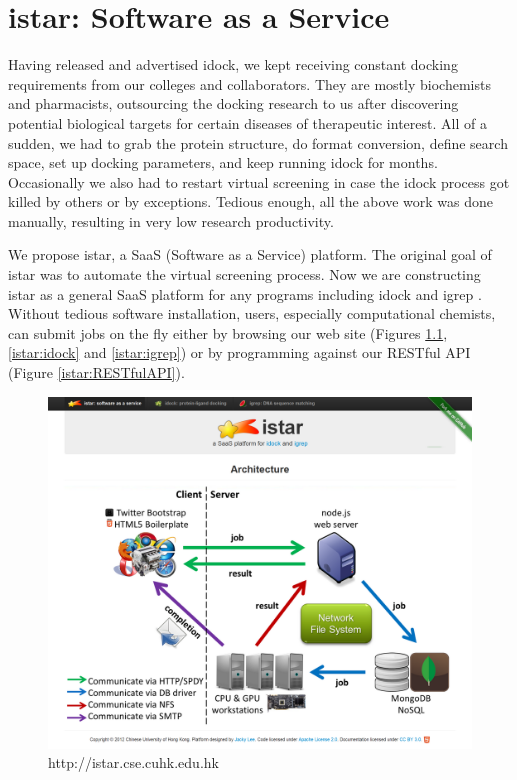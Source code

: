 \chapter{istar: Software as a Service}

Having released and advertised idock, we kept receiving constant docking requirements from our colleges and collaborators. They are mostly biochemists and pharmacists, outsourcing the docking research to us after discovering potential biological targets for certain diseases of therapeutic interest. All of a sudden, we had to grab the protein structure, do format conversion, define search space, set up docking parameters, and keep running idock for months. Occasionally we also had to restart virtual screening in case the idock process got killed by others or by exceptions. Tedious enough, all the above work was done manually, resulting in very low research productivity.

We propose istar, a SaaS (Software as a Service) platform. The original goal of istar was to automate the virtual screening process. Now we are constructing istar as a general SaaS platform for any programs including idock \citep{1153} and igrep \citep{1138}. Without tedious software installation, users, especially computational chemists, can submit jobs on the fly either by browsing our web site (Figures \ref{istar:istar}, \ref{istar:idock} and \ref{istar:igrep}) or by programming against our RESTful API (Figure \ref{istar:RESTfulAPI}).

\begin{figure}
\centering
\includegraphics[width=\linewidth]{istar/istar.png}
\caption{http://istar.cse.cuhk.edu.hk}
\label{istar:istar}
\end{figure}

